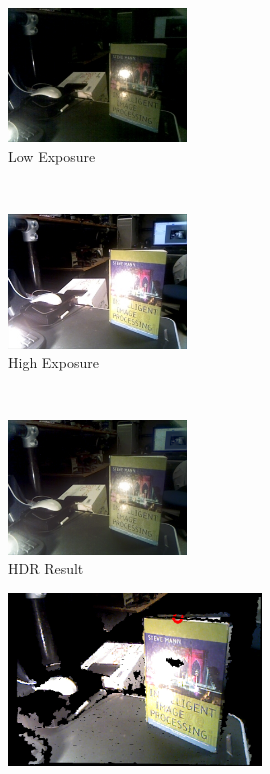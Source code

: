 \begin{figure}[t!]
    \centering
    \begin{subfigure}{0.32\textwidth}
        \centering
        \includegraphics[height=1.4in]{ch4/diagrams/hdr_results/low.jpg}
        \caption{Low Exposure}
        \label{hdr_low_expos}
    \end{subfigure}%
    ~ 
    \begin{subfigure}{0.32\textwidth}
        \centering
        \includegraphics[height=1.4in]{ch4/diagrams/hdr_results/high.jpg}
        \caption{High Exposure}
        \label{hdr_high_expos}
    \end{subfigure}
    ~
    \begin{subfigure}{0.32\textwidth}
        \centering
        \includegraphics[height=1.4in]{ch4/diagrams/hdr_results/hdr2.jpg}
        \caption{HDR Result}
        \label{hdr_result}
    \end{subfigure}
    \centering
    \begin{subfigure}{0.4\textwidth}
        \centering
        \includegraphics[height=1.8in]{ch4/diagrams/hdr_results/no_hdr.jpg}

\end{subfigure}
\end{figure}
